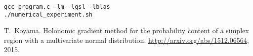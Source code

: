 \documentclass[12pt]{article}
\begin{document}
\begin{lstlisting}[style=BashInputStyle]

gcc program.c -lm -lgsl -lblas
./numerical_experiment.sh
\end{lstlisting}


\iftrue

\begin{thebibliography}{1}

T.~Koyama.
\newblock Holonomic gradient method for the probability content of a simplex
  region with a multivariate normal distribution.
\newblock \url{http://arxiv.org/abs/1512.06564}, 2015.

\end{thebibliography}

\else




\fi

\end{document}
